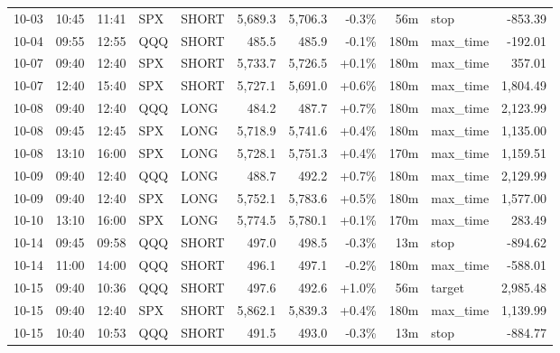 \documentclass[11pt,a4paper,twoside]{article}
\begin{document}
\begin{center}
\begin{longtable}{>{\color{txtmain}}l l l l l r r r r >{\color{txtmain}}l r}
10-03 & 10:45 & 11:41 & SPX & SHORT & 5,689.3 & 5,706.3 & \textcolor{lossred}{-0.3\%} & 56m & stop & \textcolor{lossred}{-853.39} \\
10-04 & 09:55 & 12:55 & QQQ & SHORT & 485.5 & 485.9 & \textcolor{lossred}{-0.1\%} & 180m & max\_time & \textcolor{lossred}{-192.01} \\
10-07 & 09:40 & 12:40 & SPX & SHORT & 5,733.7 & 5,726.5 & \textcolor{wingreen}{+0.1\%} & 180m & max\_time & \textcolor{wingreen}{357.01} \\
10-07 & 12:40 & 15:40 & SPX & SHORT & 5,727.1 & 5,691.0 & \textcolor{wingreen}{+0.6\%} & 180m & max\_time & \textcolor{wingreen}{1,804.49} \\
10-08 & 09:40 & 12:40 & QQQ & LONG & 484.2 & 487.7 & \textcolor{wingreen}{+0.7\%} & 180m & max\_time & \textcolor{wingreen}{2,123.99} \\
10-08 & 09:45 & 12:45 & SPX & LONG & 5,718.9 & 5,741.6 & \textcolor{wingreen}{+0.4\%} & 180m & max\_time & \textcolor{wingreen}{1,135.00} \\
10-08 & 13:10 & 16:00 & SPX & LONG & 5,728.1 & 5,751.3 & \textcolor{wingreen}{+0.4\%} & 170m & max\_time & \textcolor{wingreen}{1,159.51} \\
10-09 & 09:40 & 12:40 & QQQ & LONG & 488.7 & 492.2 & \textcolor{wingreen}{+0.7\%} & 180m & max\_time & \textcolor{wingreen}{2,129.99} \\
10-09 & 09:40 & 12:40 & SPX & LONG & 5,752.1 & 5,783.6 & \textcolor{wingreen}{+0.5\%} & 180m & max\_time & \textcolor{wingreen}{1,577.00} \\
10-10 & 13:10 & 16:00 & SPX & LONG & 5,774.5 & 5,780.1 & \textcolor{wingreen}{+0.1\%} & 170m & max\_time & \textcolor{wingreen}{283.49} \\
10-14 & 09:45 & 09:58 & QQQ & SHORT & 497.0 & 498.5 & \textcolor{lossred}{-0.3\%} & 13m & stop & \textcolor{lossred}{-894.62} \\
10-14 & 11:00 & 14:00 & QQQ & SHORT & 496.1 & 497.1 & \textcolor{lossred}{-0.2\%} & 180m & max\_time & \textcolor{lossred}{-588.01} \\
10-15 & 09:40 & 10:36 & QQQ & SHORT & 497.6 & 492.6 & \textcolor{wingreen}{+1.0\%} & 56m & target & \textcolor{wingreen}{2,985.48} \\
10-15 & 09:40 & 12:40 & SPX & SHORT & 5,862.1 & 5,839.3 & \textcolor{wingreen}{+0.4\%} & 180m & max\_time & \textcolor{wingreen}{1,139.99} \\
10-15 & 10:40 & 10:53 & QQQ & SHORT & 491.5 & 493.0 & \textcolor{lossred}{-0.3\%} & 13m & stop & \textcolor{lossred}{-884.77} \\

\end{longtable}
\end{center}
\end{document}
